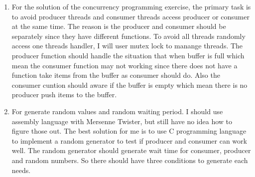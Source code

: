 \documentclass[letterpaper,11pt,titlepage]{article}
\begin{document}
\begin{enumerate}

\item For the solution of the concurrency programming exercise, the primary task is to avoid producer threads and consumer threads access producer or consumer at the same time.
The reason is the producer and consumer should be separately since they have different functions. To avoid all threads randomly access one threads handler, I will user mutex lock
to manange threads. The producer function should handle the situation that when buffer is full which mean the consumer function may not working since there does not have a function
take items from the buffer as consumer should do. Also the consumer cuntion should aware if the buffer is empty which mean there is no producer push items to the buffer.

\item For generate random values and random waiting period. I should use assembly language with Mersenne Twister, but still have no idea how to figure those out. The best solution for me is
to use C programming language to implement a random generator to test if producer and consumer can work well. The random generator should generate wait time for consumer, producer and random numbers.
So there should have three conditions to generate each needs. 

\end{enumerate}
\end{document}
